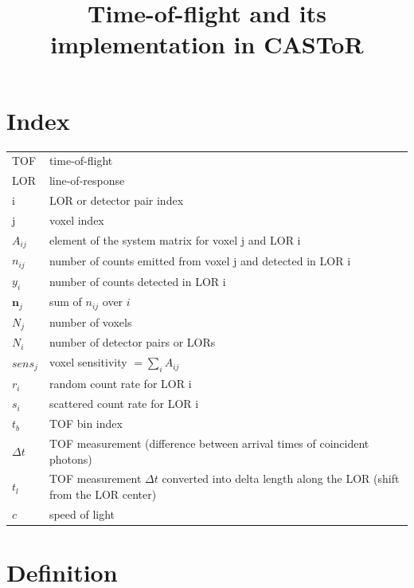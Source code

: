 \documentclass[a4paper, 11pt]{article}
\begin{document}
\title{Time-of-flight and its implementation in CASToR}
\maketitle

\section{Index}

\noindent
\begin{tabularx}{\linewidth}{p{3cm}X}
TOF & time-of-flight \\
LOR & line-of-response \\
i & LOR or detector pair index \\
j & voxel index \\
$A_{ij}$ & element of the system matrix for voxel j and LOR i \\
$n_{ij}$ & number of counts emitted from voxel j and detected in LOR i \\
$y_i$ & number of counts detected in LOR i \\
$\boldsymbol n_j$ & sum of $n_{ij}$ over $i$ \\
$N_j$ & number of voxels \\
$N_i$ & number of detector pairs or LORs \\
$sens_j$ & voxel sensitivity $=\sum_iA_{ij}$ \\
$r_i$ & random count rate for LOR i \\
$s_i$ & scattered count rate for LOR i \\
$t_b$ & TOF bin index\\
$\Delta t$ & TOF measurement (difference between arrival times of coincident photons)\\
$t_l$ & TOF measurement $\Delta t$ converted into delta length along the LOR (shift from the LOR center)\\
$c$ & speed of light\\
\end{tabularx}


\section{Definition}
\end{document}
